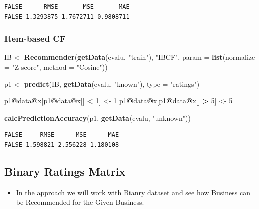 \documentclass[]{article}
\newenvironment{Shaded}{\begin{snugshade}}{\end{snugshade}}
\newcommand{\DataTypeTok}[1]{\textcolor[rgb]{0.13,0.29,0.53}{#1}}
\newcommand{\DecValTok}[1]{\textcolor[rgb]{0.00,0.00,0.81}{#1}}
\newcommand{\KeywordTok}[1]{\textcolor[rgb]{0.13,0.29,0.53}{\textbf{#1}}}
\newcommand{\NormalTok}[1]{#1}
\newcommand{\OperatorTok}[1]{\textcolor[rgb]{0.81,0.36,0.00}{\textbf{#1}}}
\newcommand{\StringTok}[1]{\textcolor[rgb]{0.31,0.60,0.02}{#1}}
\providecommand{\tightlist}{%
  \setlength{\itemsep}{0pt}\setlength{\parskip}{0pt}}
\begin{document}
\begin{verbatim}
FALSE      RMSE       MSE       MAE 
FALSE 1.3293875 1.7672711 0.9808711
\end{verbatim}

\hypertarget{item-based-cf}{%
\subsubsection{Item-based CF}\label{item-based-cf}}

\begin{Shaded}
\begin{Highlighting}[]
\NormalTok{IB <-}\StringTok{ }\KeywordTok{Recommender}\NormalTok{(}\KeywordTok{getData}\NormalTok{(evalu, }\StringTok{"train"}\NormalTok{), }\StringTok{"IBCF"}\NormalTok{, }\DataTypeTok{param =} \KeywordTok{list}\NormalTok{(}\DataTypeTok{normalize =} \StringTok{"Z-score"}\NormalTok{, }
    \DataTypeTok{method =} \StringTok{"Cosine"}\NormalTok{))}

\NormalTok{p1 <-}\StringTok{ }\KeywordTok{predict}\NormalTok{(IB, }\KeywordTok{getData}\NormalTok{(evalu, }\StringTok{"known"}\NormalTok{), }\DataTypeTok{type =} \StringTok{"ratings"}\NormalTok{)}

\NormalTok{p1}\OperatorTok{@}\NormalTok{data}\OperatorTok{@}\NormalTok{x[p1}\OperatorTok{@}\NormalTok{data}\OperatorTok{@}\NormalTok{x[] }\OperatorTok{<}\StringTok{ }\DecValTok{1}\NormalTok{] <-}\StringTok{ }\DecValTok{1}
\NormalTok{p1}\OperatorTok{@}\NormalTok{data}\OperatorTok{@}\NormalTok{x[p1}\OperatorTok{@}\NormalTok{data}\OperatorTok{@}\NormalTok{x[] }\OperatorTok{>}\StringTok{ }\DecValTok{5}\NormalTok{] <-}\StringTok{ }\DecValTok{5}

\KeywordTok{calcPredictionAccuracy}\NormalTok{(p1, }\KeywordTok{getData}\NormalTok{(evalu, }\StringTok{"unknown"}\NormalTok{))}
\end{Highlighting}
\end{Shaded}

\begin{verbatim}
FALSE     RMSE      MSE      MAE 
FALSE 1.598821 2.556228 1.180108
\end{verbatim}

\hypertarget{binary-ratings-matrix}{%
\subsection{Binary Ratings Matrix}\label{binary-ratings-matrix}}

\begin{itemize}
\tightlist
\item
  In the approach we will work with Bianry dataset and see how Business
  can be Recommended for the Given Business.
\end{itemize}
\end{document}
